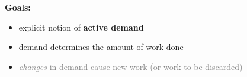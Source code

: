 \vspace{10pt}
\textbf{Goals:}
\begin{itemize}
\item explicit notion of \textbf{active demand}
\item demand determines the amount of work done
\item \textcolor{gray}{\emph{changes} in demand cause new work (or work to be discarded)}
\end{itemize}
